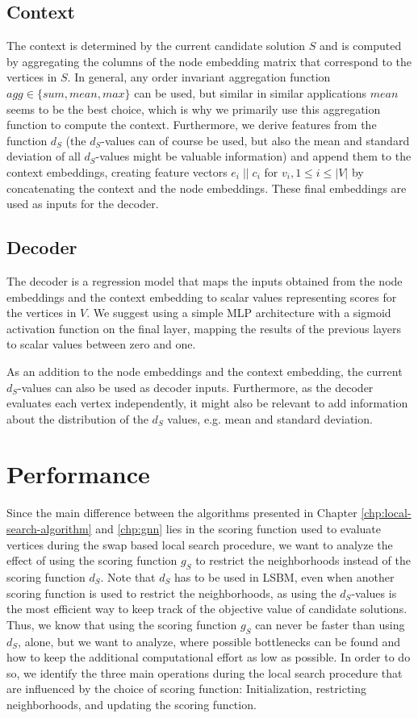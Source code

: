 \documentclass[draft,final]{vutinfth} %
\begin{document}
\subsection{Context}
The context is determined by the current candidate solution $S$ and is computed by aggregating the columns of the node embedding matrix that correspond to the vertices in $S$. In general, any order invariant aggregation function $\mathit{agg} \in \{\mathit{sum, mean, max}\}$ can be used, but similar in similar applications $\mathit{mean}$ seems to be the best choice, which is why we primarily use this aggregation function to compute the context. Furthermore, we derive features from the function $d_S$ (the $d_S$-values can of course be used, but also the mean and standard deviation of all $d_S$-values might be valuable information) and append them to the context embeddings, creating feature vectors $e_i \; || \; c_i$ for $v_i, 1 \leq i \leq |V|$ by concatenating the context and the node embeddings. These final embeddings are used as inputs for the decoder. 

\subsection{Decoder}
The decoder is a regression model that maps the inputs obtained from the node embeddings and the context embedding to scalar values representing scores for the vertices in $V$. We suggest using a simple MLP architecture with a sigmoid activation function on the final layer, mapping the results of the previous layers to scalar values between zero and one. 

As an addition to the node embeddings and the context embedding, the current $d_S$-values can also be used as decoder inputs. Furthermore, as the decoder evaluates each vertex independently, it might also be relevant to add information about the distribution of the $d_S$ values, e.g. mean and standard deviation. 

\section{Performance}\label{sec:performance}

Since the main difference between the algorithms presented in Chapter \ref{chp:local-search-algorithm} and \ref{chp:gnn} lies in the scoring function used to evaluate vertices during the swap based local search procedure, we want to analyze the effect of using the scoring function $g_S$ to restrict the neighborhoods instead of the scoring function $d_S$. Note that $d_S$ has to be used in LSBM, even when another scoring function is used to restrict the neighborhoods, as using the $d_S$-values is the most efficient way to keep track of the objective value of candidate solutions. Thus, we know that using the scoring function $g_S$ can never be faster than using $d_S$, alone, but we want to analyze, where possible bottlenecks can be found and how to keep the additional computational effort as low as possible.  
In order to do so, we identify the three main operations during the local search procedure that are influenced by the choice of scoring function: Initialization, restricting neighborhoods, and updating the scoring function.  
\end{document}
